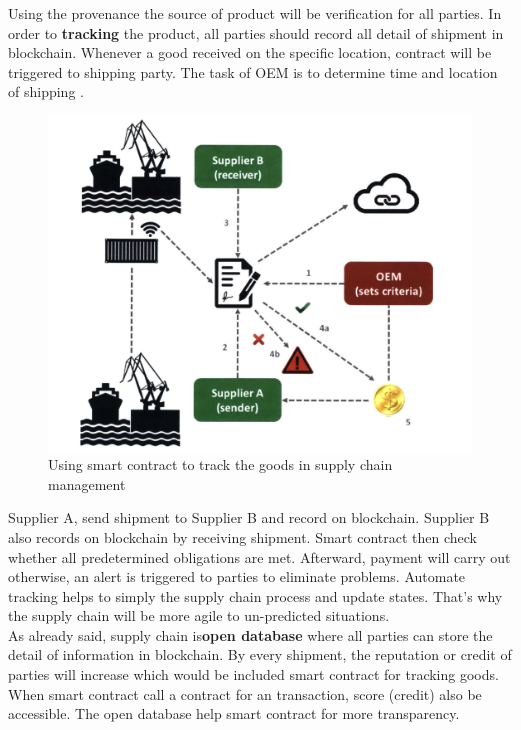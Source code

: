 Using the provenance the source of product will be verification for all parties. In order to \textbf{tracking} the product, all parties should record all detail of shipment in blockchain. Whenever a good received on the specific location, contract will be triggered to shipping party. The task of OEM is to determine time and location of shipping .\\
\begin{center}
	
	\begin{figure}[htb!]
		
		\begin{minipage}{0.55\linewidth}
			\centering
			\includegraphics[width=1.65\textwidth]{images/chap03_tracking_SCM.png}
		\end{minipage}
		\caption{Using smart contract to track the goods in supply chain management}
		
	\end{figure}
	
\end{center}

Supplier A, send shipment to Supplier B and record on blockchain. Supplier B also records on blockchain by receiving shipment. Smart contract then check whether all predetermined obligations are met.
Afterward,  payment will carry out otherwise, an alert is triggered to parties to eliminate problems.  Automate tracking helps to simply the supply chain process and update states. That's why the supply chain will be more agile to un-predicted situations.\\ 
As already said, supply chain is\textbf{open database} where all parties can store the detail of information in blockchain. By every shipment, the reputation or credit of parties will increase which would be included smart contract for tracking goods. When smart contract call a contract for an transaction,  score (credit) also be accessible. The open database help smart contract for more transparency\cite{Angwei}.

